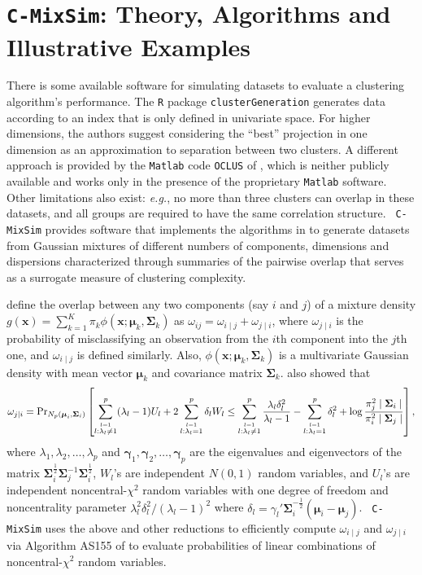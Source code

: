 \documentclass[twoside,11pt]{article}
\newcommand{\bSigma}{\boldsymbol{\Sigma}}
\newcommand{\bgamma}{\boldsymbol{\gamma}}
\newcommand{\bmu}{\boldsymbol{\mu}}
\newcommand{\bx}{\boldsymbol{x}}
\begin{document}
\section{{\tt C-MixSim}: Theory, Algorithms and Illustrative Examples}
\label{cmixsim}
There is some available software for simulating datasets to evaluate a
clustering algorithm's performance. The  \texttt{R} package
\texttt{clusterGeneration} \citep{qiuandjoe06} generates data
according to an index that is only defined in
univariate space. For higher dimensions, the authors suggest
considering the ``best'' projection in one dimension as an
approximation to separation between two clusters. A different
approach is provided by the \texttt{Matlab} code \texttt{OCLUS} of
\citet{steinleyandhenson05}, which is neither publicly available and
works only in the presence of the proprietary {\tt Matlab}
software. Other limitations also exist: {\em e.g.}, no more than three
clusters can overlap in these datasets, and all groups are required to
have the same correlation structure. {\tt 
  C-MixSim} provides software that implements the algorithms in
\citet{maitraandmelnykov09} to generate datasets from 
Gaussian mixtures of different numbers of components, dimensions and
dispersions characterized through summaries of the pairwise overlap
that serves as a surrogate measure of clustering complexity. 

\citet{maitraandmelnykov09} define the overlap between any two
components (say $i$ and $j$) of a mixture density $g(\bx) =
\sum_{k=1}^K \pi_k \phi(\bx; \bmu_k, \bSigma_k)$ as $\omega_{ij} =
\omega_{i\mid j} + \omega_{j\mid i}$, where $\omega_{j\mid i}$ is the
probability of misclassifying an observation from the $i$th component
into the $j$th one, and $\omega_{i\mid j}$ is defined
similarly. Also, $\phi(\bx; \bmu_k, 
\bSigma_k)$ is a multivariate Gaussian density with mean vector
$\bmu_k$ and covariance matrix $\bSigma_k$. 
\citet{maitraandmelnykov09} also showed that 
\begin{equation*}
\omega_{j\mid i} =  {\rm Pr}_{N_p(\bmu_i,\bSigma_i)}\left[\sum_{\overset{l=1}{l:\lambda_l\neq1}}^p  
    (\lambda_l - 1) U_l + 2\sum_{\overset{l=1}{l:\lambda_l=1}}^p
    \delta_lW_l \leq
    \sum_{\overset{l=1}{l:\lambda_l\neq1}}^p\frac{\lambda_l\delta_l^2}{\lambda_l-1}
    - \sum_{\overset{l=1}{l:\lambda_l=1}}^p\delta_l^2 + 
\log{\frac{\pi_j^2\mid\bSigma_i\mid}{\pi_i^2\mid\bSigma_j\mid}}\right], 
\end{equation*}
where $\lambda_1,\lambda_2,\ldots,\lambda_p$ and
$\bgamma_1,\bgamma_2,\ldots,\bgamma_p$  are the eigenvalues and
eigenvectors of the matrix
$\bSigma_i^{\frac12}\bSigma_j^{-1}\bSigma_i^{\frac12}$,
$W_l$'s  are independent $N(0,1)$ random variables, and $U_l$'s are
independent noncentral-$\chi^2$ random variables with one degree of
freedom and 
noncentrality parameter $\lambda^2_l\delta^2_l/(\lambda_l-1)^2$ where
$\delta_l = \gamma_l'\bSigma_i^{-\frac12}(\bmu_i - \bmu_j)$. {\tt
  C-MixSim} uses the above and other reductions to efficiently
compute $\omega_{i \mid j}$ and $\omega_{j \mid i}$ via Algorithm
AS155 of \citet{davies80} to evaluate probabilities of linear
combinations of noncentral-$\chi^2$ random variables.
\end{document}
